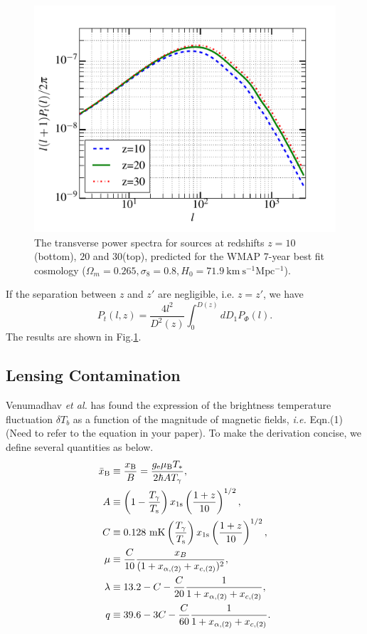 \documentclass[aps,prd,twocolumn,floatfix,showpacs,superscriptaddress,nofootinbib]{revtex4-1}
\newcommand{\ie}{{\it i.e. }}
\newcommand{\etal}{{\it et al. }}
\begin{document}
\begin{figure}
\centering
\includegraphics[scale=0.45]{pt_2.pdf}
\caption{The transverse power spectra for sources at redshifts $z=10$(bottom), $20$ and $30$(top), predicted for the WMAP 7-year best fit cosmology ($\Omega_m=0.265,\sigma_8=0.8,H_0=71.9\ \mathrm{km\ s^{-1}Mpc^{-1}}$).}
\label{Pt}
\end{figure}

If the separation between $z$ and $z'$ are negligible, i.e. $z=z'$, we have
\begin{equation}
P_t(l,z)=\frac{4l^2}{D^2(z)}\int_0^{D(z)}dD_1P_{\Phi}(l).
\end{equation}
The results are shown in Fig.\ref{Pt}.

\subsection{Lensing Contamination}
Venumadhav \etal\cite{Venumadhav:2014tqa} has found the expression of the brightness temperature fluctuation $\delta T_b$ as a function of the magnitude of magnetic fields, \ie Eqn.(1){\color{red} (Need to refer to the equation in your paper)}. To make the derivation concise, we define several quantities as below.
\begin{align}
\bar{x}_{\rm B}&\equiv\frac{x_{\rm B}}{B} = \frac{g_{\rm e} \mu_{\rm B} T_*}{2 \hbar A T_\gamma},\\
A&\equiv\left( 1 - \frac{T_\gamma}{T_{\rm s}} \right) x_{1{\rm s}} \left( \frac{1+z}{10} \right)^{1/2},\\
C&\equiv0.128 \ {\rm mK} \left( \frac{T_\gamma}{T_{\rm s}} \right) x_{1{\rm s}} \left( \frac{1+z}{10} \right)^{1/2},\\
\mu&\equiv\frac{C}{10}\frac{x_B}{(1+x_{\alpha,(2)}+x_{c,(2)})^2},\\
\lambda&\equiv 13.2-C-\frac{C}{20}\frac{1}{1+x_{\alpha,(2)}+x_{c,(2)}},\\
q&\equiv 39.6-3C-\frac{C}{60}\frac{1}{1+x_{\alpha,(2)}+x_{c,(2)}}.
\end{align}
\end{document}
